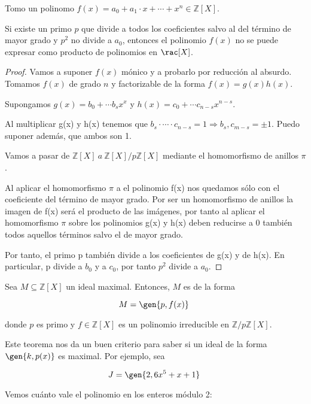 \documentclass[nochap]{apuntes}
\begin{document}
\begin{theorem}\label{thmEisenstein}
 Tomo un polinomo $f(x)=a_0  +  a_1\cdot x + \cdots + x^{n} \in \mathbb{Z}[X]$.
 
 Si existe un primo $p$ que divide a todos los coeficientes salvo al del término de mayor grado y $p^2$  no divide a $a_0$, entonces el polinomio $f(x)$ no se puede expresar como producto de polinomios en $\rac[X]$.
\end{theorem}

\begin{proof}
 Vamos a suponer $f(x)$ mónico y a probarlo por reducción al absurdo. Tomamos $f(x)$ de grado $n$ y factorizable de la forma $f(x)=g(x)h(x)$.
 
 Supongamos $g(x)=b_0+\cdots b_sx^{x}$ y $h(x)=c_0 +\cdots c_{n-s}x^{n-s}$.
 
 Al multiplicar g(x) y h(x) tenemos que $b_s \cdot \dotsb \cdot c_{n-s} = 1 \Rightarrow b_s,c_{m-s} = \pm 1$. Puedo suponer además, que ambos son 1.
 
 Vamos a pasar de $\mathbb{Z}[X] \ a \ \mathbb{Z}[X]/p\mathbb{Z}[X]$  mediante el homomorfismo de anillos $\pi$.
 
 Al aplicar el homomorfismo $\pi$  a el polinomio f(x) nos quedamos sólo con el coeficiente del término de mayor grado. Por ser un homomorfismo de anillos la imagen de f(x) será el producto de las imágenes, por tanto al aplicar el homomorfismo $\pi$  sobre los polinomios g(x) y h(x)  deben reducirse a 0 también todos aquellos términos salvo el de mayor grado. 
 
 Por tanto, el primo p también divide a los coeficientes de g(x) y de h(x). En particular, p divide a $b_0$  y a $c_0$, por tanto $p^2$  divide a $a_0$.
\end{proof}

\begin{theorem}\label{thmMaximalIrreducibleZ} Sea $M⊆ℤ[X]$ un ideal maximal. Entonces, $M$ es de la forma

\[ M = \gen{p, f(x)} \]

donde $p$ es primo y $f∈ℤ[X]$ es un polinomio irreducible en $ℤ/pℤ[X]$.
\end{theorem}

Este teorema nos da un buen criterio para saber si un ideal de la forma $\gen{k, p(x)}$ es maximal. Por ejemplo, sea

\[ J = \gen{2, 6x^5 + x + 1} \]

Vemos cuánto vale el polinomio en los enteros módulo 2:
\end{document}
